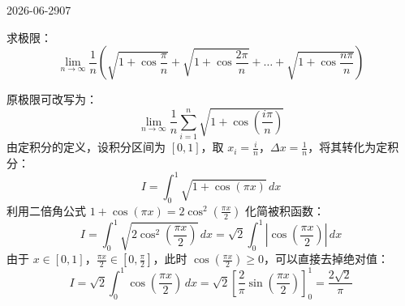 \begin{mistake}{2026-06-29}{07}

\begin{problemcontent}
求极限：
\[ \lim_{n \to \infty} \frac{1}{n} \left( \sqrt{1 + \cos \frac{\pi}{n}} + \sqrt{1 + \cos \frac{2\pi}{n}} + \dots + \sqrt{1 + \cos \frac{n\pi}{n}} \right) \]
\end{problemcontent}

\begin{solutioncontent}
原极限可改写为：
\[ \lim_{n \to \infty} \frac{1}{n} \sum_{i=1}^{n} \sqrt{1 + \cos \left( \frac{i\pi}{n} \right)} \]
由定积分的定义，设积分区间为 \([0, 1]\)，取 \(x_i = \frac{i}{n}\)，\(\Delta x = \frac{1}{n}\)，将其转化为定积分：
\[ I = \int_{0}^{1} \sqrt{1 + \cos(\pi x)} \,dx \]
利用二倍角公式 \(1 + \cos(\pi x) = 2\cos^2\left(\frac{\pi x}{2}\right)\) 化简被积函数：
\[ I = \int_{0}^{1} \sqrt{2 \cos^2\left(\frac{\pi x}{2}\right)} \,dx = \sqrt{2} \int_{0}^{1} \left| \cos\left(\frac{\pi x}{2}\right) \right| \,dx \]
由于 \(x \in [0, 1]\)，\(\frac{\pi x}{2} \in \left[0, \frac{\pi}{2}\right]\)，此时 \(\cos\left(\frac{\pi x}{2}\right) \ge 0\)，可以直接去掉绝对值：
\[ I = \sqrt{2} \int_{0}^{1} \cos\left(\frac{\pi x}{2}\right) \,dx = \sqrt{2} \left[ \frac{2}{\pi} \sin\left(\frac{\pi x}{2}\right) \right]_{0}^{1} = \frac{2\sqrt{2}}{\pi} \]
\end{solutioncontent}


\end{mistake}
